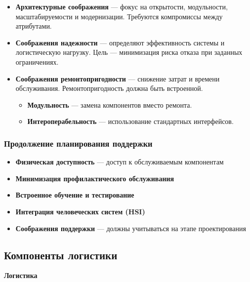 \documentclass[14pt,a4paper]{extarticle}
\begin{document}
\begin{itemize}
\item \textbf{Архитектурные соображения} — фокус на открытости, модульности, масштабируемости и модернизации. Требуются компромиссы между атрибутами.
\item \textbf{Соображения надежности} — определяют эффективность системы и логистическую нагрузку. Цель — минимизация риска отказа при заданных ограничениях.
\item \textbf{Соображения ремонтопригодности} — снижение затрат и времени обслуживания. Ремонтопригодность должна быть встроенной.
    \begin{itemize}
    \item \textbf{Модульность} — замена компонентов вместо ремонта.
    \item \textbf{Интероперабельность} — использование стандартных интерфейсов.
    \end{itemize}
\end{itemize}

\subsubsection{Продолжение планирования поддержки}

\begin{itemize}
\item \textbf{Физическая доступность} — доступ к обслуживаемым компонентам
\item \textbf{Минимизация профилактического обслуживания}
\item \textbf{Встроенное обучение и тестирование}
\item \textbf{Интеграция человеческих систем (HSI)}
\item \textbf{Соображения поддержки} — должны учитываться на этапе проектирования
\end{itemize}

\subsection{Компоненты логистики}

\textbf{Логистика}
\end{document}
